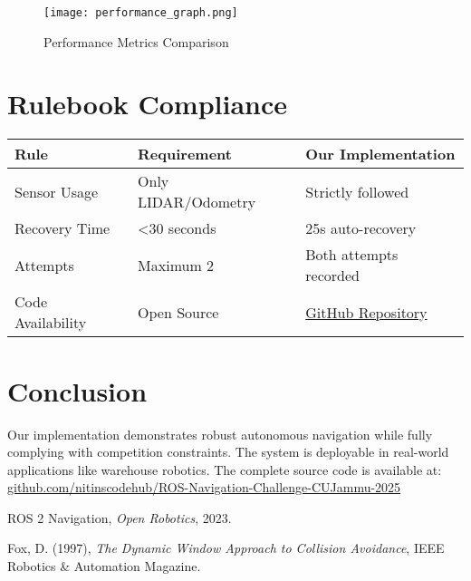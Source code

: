 \documentclass[12pt,a4paper]{article}
\begin{document}
\begin{figure}[h]
    \centering
    \texttt{[image: performance\_graph.png]}
    \caption{Performance Metrics Comparison}
    \label{fig:performance}
\end{figure}

\section{Rulebook Compliance}
\begin{tabularx}{\textwidth}{|l|X|X|}
\hline
\textbf{Rule} & \textbf{Requirement} & \textbf{Our Implementation} \\ \hline
Sensor Usage & Only LIDAR/Odometry & Strictly followed \\ \hline
Recovery Time & <30 seconds & 25s auto-recovery \\ \hline
Attempts & Maximum 2 & Both attempts recorded \\ \hline
Code Availability & Open Source & \href{https://github.com/nitinscodehub/ROS-Navigation-Challenge-CUJammu-2025/}{\textcolor{cujblue}{GitHub Repository}} \\ \hline
\end{tabularx}

\section*{Conclusion}
Our implementation demonstrates robust autonomous navigation while fully complying with competition constraints. The system is deployable in real-world applications like warehouse robotics. The complete source code is available at: \href{https://github.com/nitinscodehub/ROS-Navigation-Challenge-CUJammu-2025/}{\textcolor{cujblue}{github.com/nitinscodehub/ROS-Navigation-Challenge-CUJammu-2025}}

\begin{thebibliography}{9}
ROS 2 Navigation, 
\textit{Open Robotics}, 
2023.

Fox, D. (1997), 
\textit{The Dynamic Window Approach to Collision Avoidance}, 
IEEE Robotics \& Automation Magazine.
\end{thebibliography}
\end{document}
